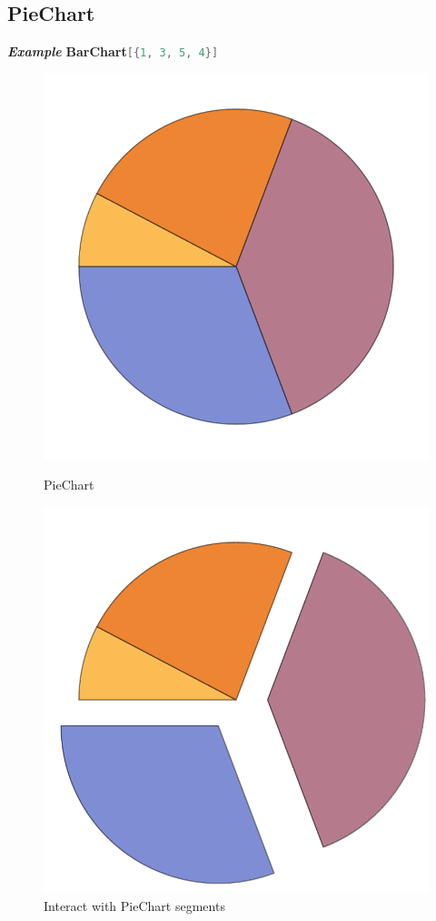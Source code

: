 \documentclass[10pt]{book}
\begin{document}
\subsection{PieChart}
\label{subsec:label}

\noindent\emph{\textbf{Example}}\quad
\textbf{BarChart}\lstinline[language=Mathematica]|[{1, 3, 5, 4}]|
\begin{figure}[H]
\begin{minipage}{.5\linewidth}
  \centering
  \includegraphics[width=0.7\linewidth]{figures/PieChart}
  \caption{PieChart}
\end{minipage}\begin{minipage}{.5\linewidth}
  \centering
  \includegraphics[width=0.7\linewidth]{figures/PieChart2}
  \caption{Interact with PieChart segments}
\end{minipage}
\end{figure}
\end{document}
